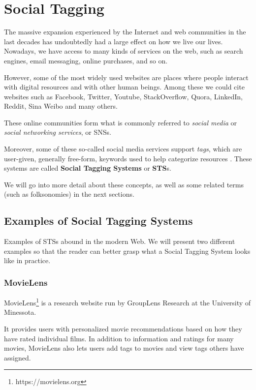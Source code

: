 \chapter{Social Tagging}\label{chap:social_tagging}

The massive expansion experienced by the Internet and web communities in the last decades has undoubtedly had a large effect on how we live our lives. Nowadays, we have access to many kinds of services on the web, such as search engines, email messaging, online purchases, and so on.

However, some of the most widely used websites are places where people interact with digital resources and with other human beings. Among these we could cite websites such as Facebook, Twitter, Youtube, StackOverflow, Quora, LinkedIn, Reddit, Sina Weibo and many others.

These online communities form what is commonly referred to \textit{social media} or \textit{social networking services}, or SNSs. \citep{obar_wildman_2015,hamburger_etal_2017}

Moreover, some of these so-called social media services support \textit{tags}, which are user-given, generally free-form, keywords used to help categorize resources \cite{mathes_2004}. These systems are called \textbf{Social Tagging Systems} or \textbf{STS}s.

We will go into more detail about these concepts, as well as some related terms (such as folksonomies) in the next sections.

\section{Examples of Social Tagging Systems}

Examples of STSs abound in the modern Web. We will present two different examples so that the reader can better grasp what a Social Tagging System looks like in practice.

\subsection{MovieLens}

MovieLens\footnote{https://movielens.org} is a research website run by GroupLens Research at the University of Minessota.

It provides users with personalized movie recommendations based on how they have rated individual films. In addition to information and ratings for many movies, MovieLens also lets users add tags to movies and view tags others have assigned.


